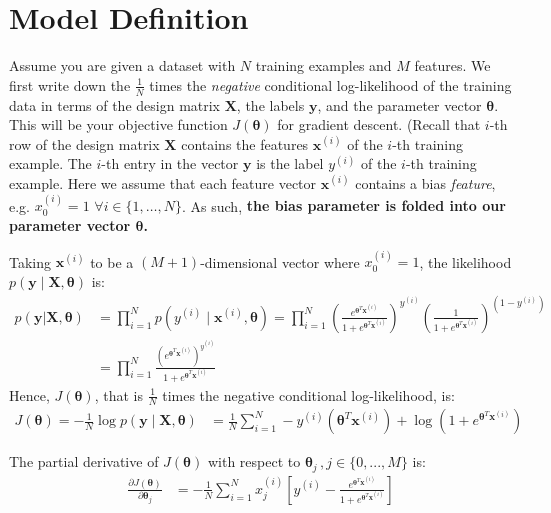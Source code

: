 \documentclass[11pt,addpoints,answers]{exam}
\newcommand{\xv}{\mathbf{x}}
\newcommand{\yv}{\mathbf{y}}
\newcommand{\Xv}{\mathbf{X}}
\newcommand{\thetav     }{\boldsymbol \theta     }
\begin{document}
\section{Model Definition}\label{modeldescript}
 
 Assume you are given a dataset with $N$ training examples and $M$ features. We first write down the $\frac{1}{N}$ times the \emph{negative} conditional log-likelihood of the training data in terms of the design matrix $\Xv$, the labels $\yv$, and the parameter vector $\thetav$. This will be your objective function $J(\thetav)$ for gradient descent. 
%
(Recall that $i$-th row of the design matrix $\Xv$ contains the features $\xv^{(i)}$ of the $i$-th training example. The $i$-th entry in the vector $\yv$ is the label $y^{(i)}$ of the $i$-th training example.  Here we assume that each feature vector $\xv^{(i)}$ contains a bias \emph{feature}, e.g. $x_0^{(i)} = 1 \,\,\forall i \in \{1,\ldots,N\}$. As such, \textbf{the bias parameter is folded into our parameter vector $\thetav$.}


Taking $\xv^{\left(i\right)}$ to be a $(M+1)$-dimensional vector where $x^{(i)}_0=1$, the likelihood $p\left(\yv \mid \mathbf{X},\thetav\right)$ is:
\begin{align}
     p(\yv |\mathbf{X},\thetav) &= \prod_{i = 1}^N p(y^{(i)} \mid  \xv^{(i)}, \thetav) = \prod_{i = 1}^N \left(\frac{e^{\thetav^T\xv^{\left(i\right)}}}{1+e^{\thetav^T\xv^{\left(i\right)}}}\right)^{y^{(i)}}\left(\frac{1}{1+e^{\thetav^T\xv^{\left(i\right)}}}\right)^{\left(1-y^{(i)}\right)}\\
    &= \prod_{i=1}^N \frac{\left(e^{\thetav^T\xv^{\left(i\right)}}\right)^{y^{(i)}}}{1+e^{\thetav^T\xv^{\left(i\right)}}}
\end{align}
Hence, $J(\thetav)$, that is $\frac{1}{N}$ times the negative conditional log-likelihood, is:
\begin{align}
    J(\thetav)= - \frac{1}{N} \log p\left(\yv \mid \mathbf{X},\thetav\right) &= \frac{1}{N}\sum_{i=1}^N  -y^{(i)}\left(\thetav^T\xv^{\left(i\right)}\right)+\log\left(1+e^{\thetav^T\xv^{\left(i\right)}}\right)
\end{align}


The partial derivative of $J(\thetav)$ with respect to $\thetav_j \,, j\in\{0,...,M\}$ is:
\begin{align}
    \frac{\partial J(\thetav)}{\partial \thetav_j} &= -\frac{1}{N} \sum_{i=1}^N x_j^{\left(i\right)}\left[y^{(i)}-\frac{e^{\thetav^T\xv^{\left(i\right)}}}{1+e^{\thetav^T\xv^{\left(i\right)}}}\right]
\end{align}
\end{document}
